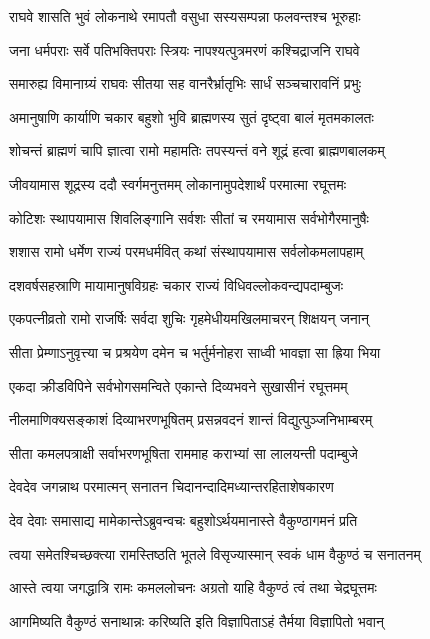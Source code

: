 \twolineshloka
{राघवे शासति भुवं लोकनाथे रमापतौ}
{वसुधा सस्यसम्पन्ना फलवन्तश्च भूरुहाः} %

\twolineshloka
{जना धर्मपराः सर्वे पतिभक्तिपराः स्त्रियः}
{नापश्यत्पुत्रमरणं कश्चिद्राजनि राघवे} %

\twolineshloka
{समारुह्य विमानाग्र्यं राघवः सीतया सह}
{वानरैर्भ्रातृभिः सार्धं सञ्चचारावनिं प्रभुः} %

\twolineshloka
{अमानुषाणि कार्याणि चकार बहुशो भुवि}
{ब्राह्मणस्य सुतं दृष्ट्वा बालं मृतमकालतः} %

\twolineshloka
{शोचन्तं ब्राह्मणं चापि ज्ञात्वा रामो महामतिः}
{तपस्यन्तं वने शूद्रं हत्वा ब्राह्मणबालकम्} %

\twolineshloka
{जीवयामास शूद्रस्य ददौ स्वर्गमनुत्तमम्}
{लोकानामुपदेशार्थं परमात्मा रघूत्तमः} %

\twolineshloka
{कोटिशः स्थापयामास शिवलिङ्गानि सर्वशः}
{सीतां च रमयामास सर्वभोगैरमानुषैः} %

\twolineshloka
{शशास रामो धर्मेण राज्यं परमधर्मवित्}
{कथां संस्थापयामास सर्वलोकमलापहाम्} %

\twolineshloka
{दशवर्षसहस्राणि मायामानुषविग्रहः}
{चकार राज्यं विधिवल्लोकवन्द्यपदाम्बुजः} %

\twolineshloka
{एकपत्नीव्रतो रामो राजर्षिः सर्वदा शुचिः}
{गृहमेधीयमखिलमाचरन् शिक्षयन् जनान्} %

\twolineshloka
{सीता प्रेम्णाऽनुवृत्त्या च प्रश्रयेण दमेन च}
{भर्तुर्मनोहरा साध्वी भावज्ञा सा ह्रिया भिया} %

\twolineshloka
{एकदा क्रीडविपिने सर्वभोगसमन्विते}
{एकान्ते दिव्यभवने सुखासीनं रघूत्तमम्} %

\twolineshloka
{नीलमाणिक्यसङ्काशं दिव्याभरणभूषितम्}
{प्रसन्नवदनं शान्तं विद्युत्पुञ्जनिभाम्बरम्} %

\twolineshloka
{सीता कमलपत्राक्षी सर्वाभरणभूषिता}
{राममाह कराभ्यां सा लालयन्ती पदाम्बुजे} %

\twolineshloka
{देवदेव जगन्नाथ परमात्मन् सनातन}
{चिदानन्दादिमध्यान्तरहिताशेषकारण} %

\twolineshloka
{देव देवाः समासाद्य मामेकान्तेऽब्रुवन्वचः}
{बहुशोऽर्थयमानास्ते वैकुण्ठागमनं प्रति} %

\twolineshloka
{त्वया समेतश्चिच्छक्त्या रामस्तिष्ठति भूतले}
{विसृज्यास्मान् स्वकं धाम वैकुण्ठं च सनातनम्} %

\twolineshloka
{आस्ते त्वया जगद्धात्रि रामः कमललोचनः}
{अग्रतो याहि वैकुण्ठं त्वं तथा चेद्रघूत्तमः} %

\twolineshloka
{आगमिष्यति वैकुण्ठं सनाथान्नः करिष्यति}
{इति विज्ञापिताऽहं तैर्मया विज्ञापितो भवान्} %


